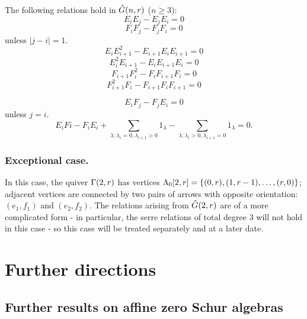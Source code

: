 \documentclass[a4paper, 11pt]{report}
\begin{document}
\begin{lemma}
The following relations hold in $\generic$ ($n\geq 3$):
\begin{equation*}
E_iE_j - E_jE_i = 0
\end{equation*}
\begin{equation*}
F_iF_j - F_jF_i = 0
\end{equation*}
unless $|j-i|=1$.
\begin{equation*}
E_iE_{i+1}^2 - E_{i+1}E_iE_{i+1} = 0
\end{equation*}
\begin{equation*}
E_i^2E_{i+1} - E_iE_{i+1}E_i = 0
\end{equation*}
\begin{equation*}
F_{i+1}F_i^2 - F_iF_{i+1}F_i = 0
\end{equation*}
\begin{equation*}
F_{i+1}^2F_i - F_{i+1}F_iF_{i+1} = 0
\end{equation*}

\begin{equation*}
E_iF_j - F_jE_i = 0
\end{equation*}
unless $j=i$.
\begin{equation*}
E_iFi - F_iE_i + \sum_{\lambda:\lambda_i = 0,\lambda_{i+1}>0} 1_\lambda - \sum_{\lambda:\lambda_i>0, \lambda_{i+1}=0} 1_\lambda = 0.
\end{equation*}
\end{lemma}

\subsection{Exceptional case.}

In this case, the quiver $\presentationquiver[2,r]$ has vertices $\compositions[2,r]=\{(0,r), (1,r-1),\ldots, (r,0)\}$; adjacent vertices are connected by two pairs of arrows with opposite orientation: $(e_1,f_1)$ and $(e_2,f_2)$. The relations arising from $\generic[2,r]$ are of a more complicated form - in particular, the serre relations of total degree $3$ will not hold in this case - so this case will be treated separately and at a later date.

\chapter{Further directions}

\section{Further results on affine zero Schur algebras}
\end{document}

